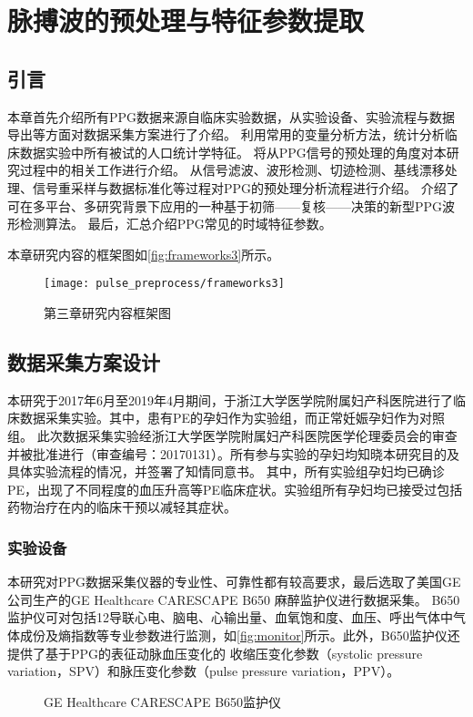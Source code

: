 \chapter{脉搏波的预处理与特征参数提取}
\section{引言}
本章首先介绍所有PPG数据来源自临床实验数据，从实验设备、实验流程与数据导出等方面对数据采集方案进行了介绍。
利用常用的变量分析方法，统计分析临床数据实验中所有被试的人口统计学特征。
将从PPG信号的预处理的角度对本研究过程中的相关工作进行介绍。
从信号滤波、波形检测、切迹检测、基线漂移处理、信号重采样与数据标准化等过程对PPG的预处理分析流程进行介绍。
介绍了可在多平台、多研究背景下应用的一种基于初筛——复核——决策的新型PPG波形检测算法。
最后，汇总介绍PPG常见的时域特征参数。

本章研究内容的框架图如\autoref{fig:frameworks3}所示。

\begin{figure}[htbp]
    \centering
    \texttt{[image: pulse\_preprocess/frameworks3]}
    \caption{\label{fig:frameworks3}第三章研究内容框架图}
\end{figure}
\section{数据采集方案设计}
本研究于2017年6月至2019年4月期间，于浙江大学医学院附属妇产科医院进行了临床数据采集实验。其中，患有PE的孕妇作为实验组，而正常妊娠孕妇作为对照组。
此次数据采集实验经浙江大学医学院附属妇产科医院医学伦理委员会的审查并被批准进行（审查编号：20170131）。所有参与实验的孕妇均知晓本研究目的及具体实验流程的情况，并签署了知情同意书。
其中，所有实验组孕妇均已确诊PE，出现了不同程度的血压升高等PE临床症状。实验组所有孕妇均已接受过包括药物治疗在内的临床干预以减轻其症状。
\subsection{实验设备}
本研究对PPG数据采集仪器的专业性、可靠性都有较高要求，最后选取了美国GE公司生产的GE Healthcare CARESCAPE B650 麻醉监护仪进行数据采集。
B650监护仪可对包括12导联心电、脑电、心输出量、血氧饱和度、血压、呼出气体中气体成份及熵指数等专业参数进行监测，如\autoref{fig:monitor}所示。此外，B650监护仪还提供了基于PPG的表征动脉血压变化的
收缩压变化参数（systolic pressure variation，SPV）和脉压变化参数（pulse pressure variation，PPV）\cite{GE2021,Michard1999}。
\begin{figure}[htbp]
    \centering
    \quad
    \caption{\label{fig:monitor}GE Healthcare CARESCAPE B650监护仪}
\end{figure}

